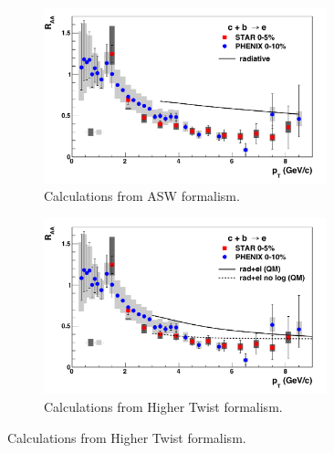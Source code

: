 
\begin{figure}[!htp]
   \centering
   \begin{subfigure}[b]{0.7\textwidth}
        \includegraphics[width=0.90\textwidth]{fig/raa-nonphot-armesto}
       \caption{Calculations from ASW formalism\cite{Armesto:2003jh}.}
       \label{Fig:hqASW}
    \end{subfigure}
 
  \begin{subfigure}[b]{0.7\textwidth}
        \includegraphics[width=0.90\textwidth]{fig/raa-nonphot-qin}
       \caption{Calculations from Higher Twist formalism\cite{Qin:2009gw}.}
       \label{Fig:hqHT}
    \end{subfigure}
 

\end{figure}
